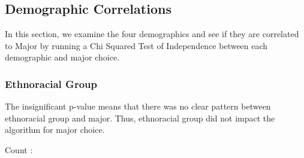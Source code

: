 \documentclass[
  twocolumn]{article}
\newenvironment{Shaded}{\begin{snugshade}}{\end{snugshade}}
\newcommand{\FunctionTok}[1]{\textcolor[rgb]{0.13,0.29,0.53}{\textbf{#1}}}
\newcommand{\NormalTok}[1]{#1}
\newcommand{\SpecialCharTok}[1]{\textcolor[rgb]{0.81,0.36,0.00}{\textbf{#1}}}
\begin{document}
\subsection{Demographic Correlations}\label{demographic-correlations-1}

In this section, we examine the four demographics and see if they are
correlated to Major by running a Chi Squared Test of Independence
between each demographic and major choice.

\subsubsection{Ethnoracial Group}\label{ethnoracial-group-1}

The insignificant p-value means that there was no clear pattern between
ethnoracial group and major. Thus, ethnoracial group did not impact the
algorithm for major choice.

\begin{Shaded}
\end{Shaded}

Count :
\end{document}
